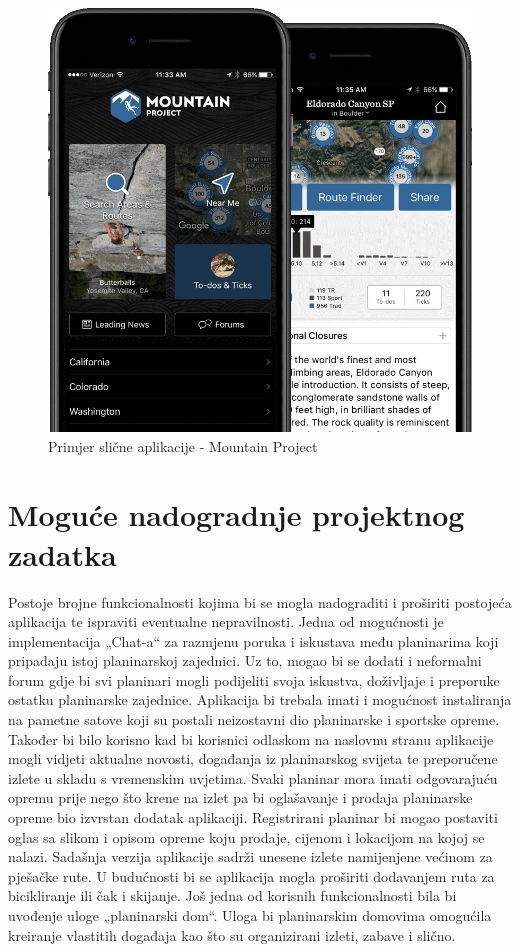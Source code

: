 			\begin{figure}[H]
				\includegraphics[scale=0.3]{slike/mountainproject.png} %
				\centering
				\caption{Primjer slične aplikacije - Mountain Project}
				\label{fig:slične aplikacije}
			\end{figure}
		
		\section{Moguće nadogradnje projektnog zadatka}
		Postoje brojne funkcionalnosti kojima bi se mogla nadograditi i proširiti postojeća aplikacija te ispraviti eventualne nepravilnosti. Jedna od mogućnosti je implementacija „Chat-a“ za razmjenu poruka i iskustava među planinarima koji pripadaju istoj planinarskoj zajednici. Uz to, mogao bi se dodati i neformalni forum gdje bi svi planinari mogli podijeliti svoja iskustva, doživljaje i preporuke ostatku planinarske zajednice. Aplikacija bi trebala imati i mogućnost instaliranja na pametne satove koji su postali neizostavni dio planinarske i sportske opreme.  Također bi bilo korisno kad bi korisnici odlaskom na naslovnu stranu aplikacije mogli vidjeti aktualne novosti, događanja iz planinarskog svijeta te preporučene izlete u skladu s vremenskim uvjetima. Svaki planinar mora imati odgovarajuću opremu prije nego što krene na izlet pa bi oglašavanje i prodaja planinarske opreme bio izvrstan dodatak aplikaciji. Registrirani planinar bi mogao postaviti oglas sa slikom i opisom opreme koju prodaje, cijenom i lokacijom na kojoj se nalazi. Sadašnja verzija aplikacije sadrži unesene izlete namijenjene većinom za pješačke rute. U budućnosti bi se aplikacija mogla proširiti dodavanjem ruta za bicikliranje ili čak i skijanje. Još jedna od korisnih funkcionalnosti bila bi uvođenje uloge „planinarski dom“. Uloga bi planinarskim domovima omogućila kreiranje vlastitih događaja kao što su organizirani izleti, zabave i slično. 
		
		\eject
		
	